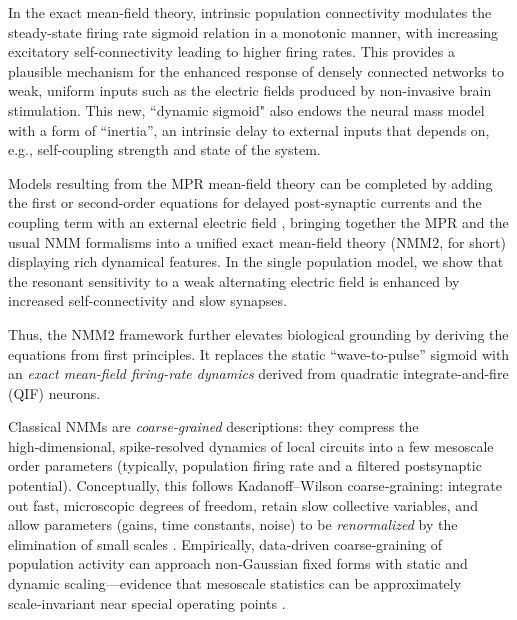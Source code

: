 \documentclass[12pt]{article}
\numberwithin{equation}{section}
\begin{document}
\begin{tcolorbox}[colback=gray!6,colframe=gray!6,enlarge left by=0mm, boxrule=0pt, enhanced, sharp corners]
 In the exact mean-field theory,  intrinsic population connectivity modulates the steady-state firing rate sigmoid relation in a monotonic manner, with increasing excitatory self-connectivity leading to higher firing rates.  This provides a plausible mechanism for the enhanced response of densely connected networks to weak, uniform inputs such as the electric fields produced by non-invasive brain stimulation. This new, ``dynamic sigmoid"  also endows the neural mass model with a form of ``inertia'', an intrinsic delay to external inputs that depends on, e.g.,  self-coupling strength and state of the system.  
 
Models resulting from the MPR mean-field theory can be completed by adding the first or second-order equations for delayed post-synaptic currents and the coupling term with an external electric field \cite{Devalle:2017aa,ruffiniAnalysisExtensionExact2022,clusellaComparisonExactHeuristic2023}, bringing together the MPR and the usual NMM formalisms into a unified exact mean-field theory (NMM2, for short) displaying rich dynamical features.  In the single population model, we show that the resonant sensitivity to a weak alternating electric field is enhanced by increased self-connectivity and slow synapses.



Thus, the NMM2 framework further elevates biological grounding by deriving the equations from first principles. It replaces the static ``wave-to-pulse'' sigmoid with an \textit{exact mean-field firing-rate dynamics} derived from quadratic integrate-and-fire (QIF) neurons. 
\end{tcolorbox}


 
Classical NMMs are \emph{coarse‑grained} descriptions: they compress the high‑dimensional, spike‑resolved dynamics of local circuits into a few mesoscale order parameters (typically, population firing rate and a filtered postsynaptic potential). Conceptually, this follows Kadanoff–Wilson coarse‑graining: integrate out fast, microscopic degrees of freedom, retain slow collective variables, and allow parameters (gains, time constants, noise) to be \emph{renormalized} by the elimination of small scales \cite{kadanoffScalingLawsIsing1966,wilsonRenormalizationGroupCritical1975}. Empirically, data‑driven coarse‑graining of population activity can approach non‑Gaussian fixed forms with static and dynamic scaling—evidence that mesoscale statistics can be approximately scale‑invariant near special operating points \cite{meshulamCoarseGrainingFixed2019}.
\end{document}
